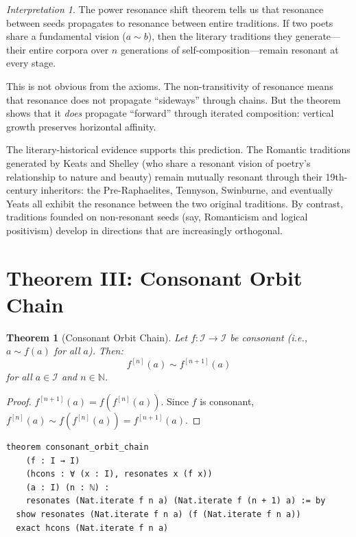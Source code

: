\documentclass[11pt,openany]{book}
\theoremstyle{definition}
\theoremstyle{plain}
\newtheorem{theorem}[axiom]{Theorem}
\theoremstyle{remark}
\newtheorem{interpretation}[axiom]{Interpretation}
\newcommand{\IS}{\mathcal{I}}               %
\newcommand{\res}{\sim}                      %
\begin{document}
\begin{interpretation}
The power resonance shift theorem tells us that resonance between seeds propagates to resonance between entire traditions. If two poets share a fundamental vision ($a \res b$), then the literary traditions they generate---their entire corpora over $n$ generations of self-composition---remain resonant at every stage.

This is not obvious from the axioms. The non-transitivity of resonance means that resonance does not propagate ``sideways'' through chains. But the theorem shows that it \emph{does} propagate ``forward'' through iterated composition: vertical growth preserves horizontal affinity.

The literary-historical evidence supports this prediction. The Romantic traditions generated by Keats and Shelley (who share a resonant vision of poetry's relationship to nature and beauty) remain mutually resonant through their 19th-century inheritors: the Pre-Raphaelites, Tennyson, Swinburne, and eventually Yeats all exhibit the resonance between the two original traditions. By contrast, traditions founded on non-resonant seeds (say, Romanticism and logical positivism) develop in directions that are increasingly orthogonal.
\end{interpretation}

\section{Theorem III: Consonant Orbit Chain}

\begin{theorem}[Consonant Orbit Chain]
\label{thm:key-orbit-chain}
Let $f : \IS \to \IS$ be consonant (i.e., $a \res f(a)$ for all $a$). Then:
\[
f^{[n]}(a) \res f^{[n+1]}(a)
\]
for all $a \in \IS$ and $n \in \mathbb{N}$.
\end{theorem}

\begin{proof}
$f^{[n+1]}(a) = f(f^{[n]}(a))$. Since $f$ is consonant, $f^{[n]}(a) \res f(f^{[n]}(a)) = f^{[n+1]}(a)$.
\end{proof}

\begin{lstlisting}
theorem consonant_orbit_chain
    (f : I → I)
    (hcons : ∀ (x : I), resonates x (f x))
    (a : I) (n : ℕ) :
    resonates (Nat.iterate f n a) (Nat.iterate f (n + 1) a) := by
  show resonates (Nat.iterate f n a) (f (Nat.iterate f n a))
  exact hcons (Nat.iterate f n a)
\end{lstlisting}
\end{document}
